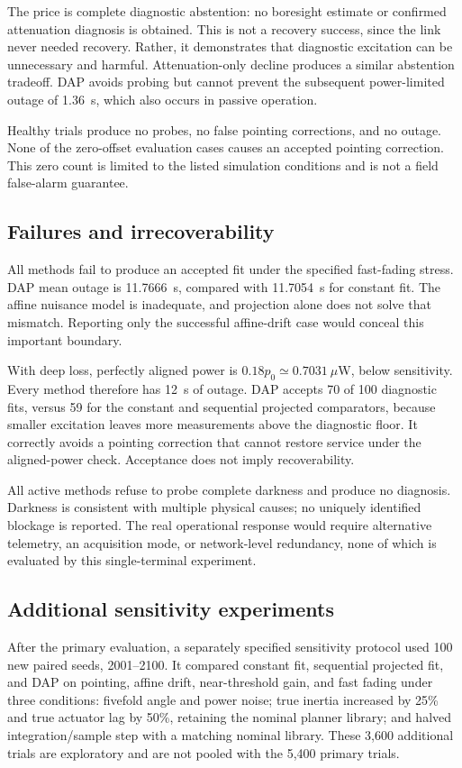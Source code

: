 \documentclass[journal]{IEEEtran}
\begin{document}
The price is complete diagnostic abstention: no boresight estimate or confirmed attenuation diagnosis is obtained. This is not a recovery success, since the link never needed recovery. Rather, it demonstrates that diagnostic excitation can be unnecessary and harmful. Attenuation-only decline produces a similar abstention tradeoff. DAP avoids probing but cannot prevent the subsequent power-limited outage of 1.36~s, which also occurs in passive operation.

Healthy trials produce no probes, no false pointing corrections, and no outage. None of the zero-offset evaluation cases causes an accepted pointing correction. This zero count is limited to the listed simulation conditions and is not a field false-alarm guarantee.

\subsection{Failures and irrecoverability}
All methods fail to produce an accepted fit under the specified fast-fading stress. DAP mean outage is 11.7666~s, compared with 11.7054~s for constant fit. The affine nuisance model is inadequate, and projection alone does not solve that mismatch. Reporting only the successful affine-drift case would conceal this important boundary.

With deep loss, perfectly aligned power is $0.18p_0\simeq0.7031~\mu$W, below sensitivity. Every method therefore has 12~s of outage. DAP accepts 70 of 100 diagnostic fits, versus 59 for the constant and sequential projected comparators, because smaller excitation leaves more measurements above the diagnostic floor. It correctly avoids a pointing correction that cannot restore service under the aligned-power check. Acceptance does not imply recoverability.

All active methods refuse to probe complete darkness and produce no diagnosis. Darkness is consistent with multiple physical causes; no uniquely identified blockage is reported. The real operational response would require alternative telemetry, an acquisition mode, or network-level redundancy, none of which is evaluated by this single-terminal experiment.

\subsection{Additional sensitivity experiments}
After the primary evaluation, a separately specified sensitivity protocol used 100 new paired seeds, 2001--2100. It compared constant fit, sequential projected fit, and DAP on pointing, affine drift, near-threshold gain, and fast fading under three conditions: fivefold angle and power noise; true inertia increased by 25\% and true actuator lag by 50\%, retaining the nominal planner library; and halved integration/sample step with a matching nominal library. These 3,600 additional trials are exploratory and are not pooled with the 5,400 primary trials.
\end{document}
